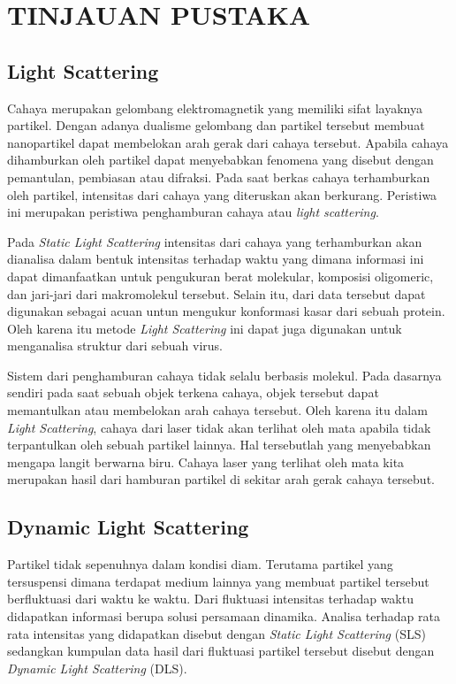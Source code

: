 \chapter{TINJAUAN PUSTAKA}

\section{Light Scattering}
Cahaya merupakan gelombang elektromagnetik yang memiliki sifat layaknya partikel. Dengan adanya
dualisme gelombang dan partikel tersebut membuat nanopartikel dapat membelokan arah gerak dari
cahaya tersebut. Apabila cahaya dihamburkan oleh partikel dapat menyebabkan fenomena yang disebut
dengan pemantulan, pembiasan atau difraksi. Pada saat berkas cahaya terhamburkan oleh partikel,
intensitas dari cahaya yang diteruskan akan berkurang. Peristiwa ini merupakan peristiwa penghamburan
cahaya atau \textit{light scattering}\cite{Black1996}.

Pada \textit{Static Light Scattering} intensitas dari cahaya yang terhamburkan  akan dianalisa dalam
bentuk intensitas terhadap waktu yang dimana informasi ini dapat dimanfaatkan untuk pengukuran berat
molekular, komposisi oligomeric, dan jari-jari dari makromolekul tersebut. Selain itu, dari data
tersebut dapat digunakan sebagai acuan untun mengukur konformasi kasar dari sebuah protein. Oleh
karena itu metode \textit{Light Scattering} ini dapat juga digunakan untuk menganalisa struktur dari
sebuah virus\cite{Stetefeld2016}.

Sistem dari penghamburan cahaya tidak selalu berbasis molekul. Pada dasarnya sendiri pada saat
sebuah objek terkena cahaya, objek tersebut dapat memantulkan atau membelokan arah cahaya tersebut.
Oleh karena itu dalam \textit{Light Scattering}, cahaya dari laser tidak akan terlihat oleh mata
apabila tidak terpantulkan oleh sebuah partikel lainnya. Hal tersebutlah yang menyebabkan mengapa
langit berwarna biru. Cahaya laser yang terlihat oleh mata kita merupakan hasil dari hamburan
partikel di sekitar arah gerak cahaya tersebut\cite{Zidan2022}.



\section{Dynamic Light Scattering}
Partikel tidak sepenuhnya dalam kondisi diam. Terutama partikel yang tersuspensi dimana terdapat
medium lainnya yang membuat partikel tersebut berfluktuasi dari waktu ke waktu. Dari fluktuasi
intensitas terhadap waktu didapatkan informasi berupa solusi persamaan dinamika. Analisa terhadap
rata rata intensitas yang didapatkan disebut dengan \textit{Static Light Scattering} (SLS) sedangkan
kumpulan data hasil dari fluktuasi partikel tersebut disebut dengan \textit{Dynamic Light Scattering}
(DLS).

